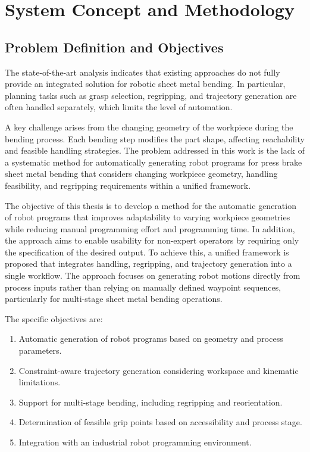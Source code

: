 \chapter{System Concept and Methodology}
\label{ch:system-concept-methodology}

\section{Problem Definition and Objectives}
\label{sec:problem-definition-and-objectives}

The state-of-the-art analysis indicates that existing approaches do not fully provide an integrated solution for robotic sheet metal bending. In particular, planning tasks such as grasp selection, regripping, and trajectory generation are often handled separately, which limits the level of automation.

A key challenge arises from the changing geometry of the workpiece during the bending process. Each bending step modifies the part shape, affecting reachability and feasible handling strategies. The problem addressed in this work is the lack of a systematic method for automatically generating robot programs for press brake sheet metal bending that considers changing workpiece geometry, handling feasibility, and regripping requirements within a unified framework.

The objective of this thesis is to develop a method for the automatic generation of robot programs that improves adaptability to varying workpiece geometries while reducing manual programming effort and programming time. In addition, the approach aims to enable usability for non-expert operators by requiring only the specification of the desired output. To achieve this, a unified framework is proposed that integrates handling, regripping, and trajectory generation into a single workflow. The approach focuses on generating robot motions directly from process inputs rather than relying on manually defined waypoint sequences, particularly for multi-stage sheet metal bending operations.

The specific objectives are:
\begin{enumerate}
    \item Automatic generation of robot programs based on geometry and process parameters.
    \item Constraint-aware trajectory generation considering workspace and kinematic limitations.
    \item Support for multi-stage bending, including regripping and reorientation.
    \item Determination of feasible grip points based on accessibility and process stage.
    \item Integration with an industrial robot programming environment.
\end{enumerate}

